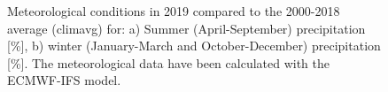 \begin{figure}[H]
  \caption{Meteorological conditions in 2019 compared to the 2000-2018 average (climavg) for: a) Summer (April-September) precipitation [\%], b) winter (January-March and October-December) precipitation [\%]. The meteorological data have been calculated with the ECMWF-IFS model.} 
\label{fig:prec-avMET}
\end{figure}


